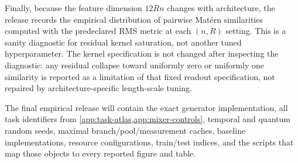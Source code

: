 Finally, because the feature dimension $12Rn$ changes with architecture, the
release records the empirical distribution of pairwise Mat\'ern similarities
computed with the predeclared RMS metric at each $(n,R)$ setting.  This is a
sanity diagnostic for residual kernel saturation, not another tuned
hyperparameter.  The kernel specification is not changed after inspecting the
diagnostic: any residual collapse toward uniformly zero or uniformly one
similarity is reported as a limitation of that fixed readout specification,
not repaired by architecture-specific length-scale tuning.

The final empirical release will contain the exact generator implementation,
all task identifiers from \cref{app:task-atlas,app:mixer-controls}, temporal and quantum random
seeds, maximal branch/pool/measurement caches, baseline implementations,
resource configurations, train/test indices, and the scripts that map
those objects to every reported figure and table.
